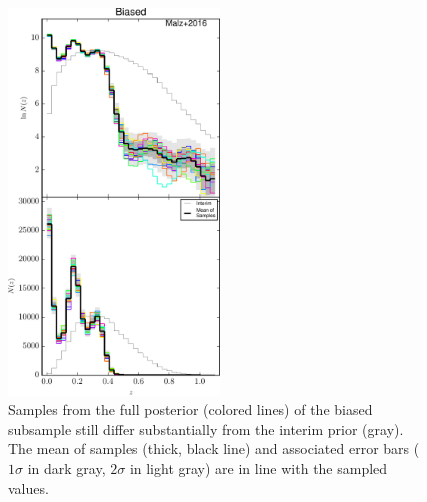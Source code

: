\documentclass[preprint]{aastex}
\begin{document}
\begin{figure}
\includegraphics[width=0.5\textwidth]{figs/bias/samps.pdf}
\caption{Samples from the full posterior (colored lines) of the biased 
subsample still differ substantially from the interim prior (gray).  The mean 
of samples (thick, black line) and associated error bars ($1\sigma$ in dark 
gray, $2\sigma$ in light gray) are in line with the sampled values.}
\label{fig:biasparam}
\end{figure}
\end{document}
